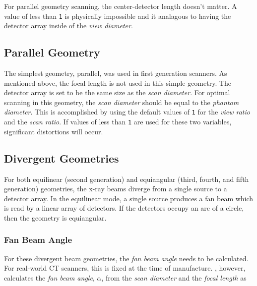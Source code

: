 For parallel geometry scanning, the center-detector length doesn't matter.
A value of less than \texttt{1} is physically impossible and it analagous to
having the detector array inside of the \emph{view diameter}.


\subsection{Parallel Geometry}\label{geometryparallel}

The simplest geometry, parallel, was used in first generation
scanners. As mentioned above, the focal length is not used in this simple
geometry. The detector array is set to be the same size as the
\emph{scan diameter}.  For optimal scanning in this geometry, the
\emph{scan diameter} should be equal to the \emph{phantom
diameter}. This is accomplished by using the default values of
\texttt{1} for the \emph{view ratio} and the \emph{scan ratio}. If
values of less than \texttt{1} are used for these two variables,
significant distortions will occur.


\subsection{Divergent Geometries}\label{geometrydivergent}
For both equilinear (second generation) and equiangular
(third, fourth, and fifth generation) geometries,
the x-ray beams diverge from a single source to a detector array.
In the equilinear mode, a single
source produces a fan beam which is read by a linear array of detectors.  If
the detectors occupy an arc of a circle, then the geometry is equiangular.
\begin{figure}
\centerline{}
\end{figure}


\subsubsection{Fan Beam Angle}
For these divergent beam geometries, the \emph{fan beam angle}
needs to be calculated. For real-world CT scanners, this is fixed
at the time of manufacture. \ctsim, however, calculates the
\emph{fan beam angle}, $\alpha$, from the \emph{scan diameter} and
the \emph{focal length} as
\begin{figure}
\centerline{}
\end{figure}


